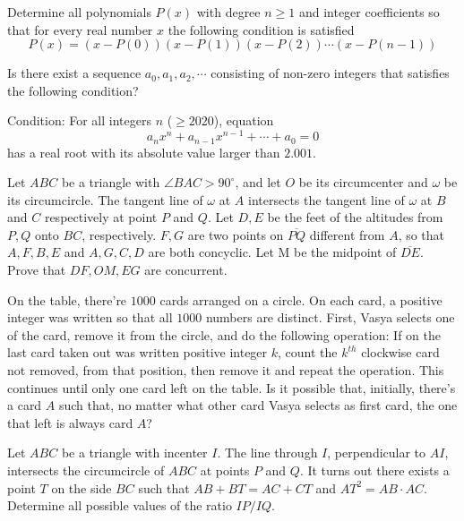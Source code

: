 \documentclass[11pt]{scrartcl}
\begin{document}
\begin{problem}[5871948911817167044]
Determine all polynomials $P(x)$ with degree $n\geq 1$ and integer coefficients so that for every real number $x$ the following condition is satisfied
$$P(x)=(x-P(0))(x-P(1))(x-P(2))\cdots (x-P(n-1))$$
\end{problem}
\begin{problem}[637496989440645]
Is there exist a sequence $a_0,a_1,a_2,\cdots $ consisting of non-zero integers that satisfies the following condition?

Condition: For all integers $n$ ($\ge 2020$), equation
$$a_n x^n+a_{n-1}x^{n-1}+\cdots +a_0=0$$has a real root with its absolute value larger than $2.001$.
\end{problem}
\begin{problem}[571373387028298]
Let $ABC$ be a triangle with $\angle BAC > 90 ^{\circ}$, and let $O$ be its circumcenter and $\omega$ be its circumcircle. The tangent line of $\omega$ at $A$ intersects the tangent line of $\omega$ at $B$ and $C$ respectively at point $P$ and $Q$. Let $D,E$ be the feet of the altitudes from $P,Q$ onto $BC$, respectively. $F,G$ are two points on $\overline{PQ}$ different from $A$, so that $A,F,B,E$ and $A,G,C,D$ are both concyclic. Let M be the midpoint of $\overline{DE}$. Prove that $DF,OM,EG$ are concurrent.
\end{problem}
\begin{problem}[1527496195334546428]
On the table, there're $1000$ cards arranged on a circle. On each card, a positive integer was written so that all $1000$ numbers are distinct. First, Vasya selects one of the card, remove it from the circle, and do the following operation: If on the last card taken out was written positive integer $k$, count the $k^{th}$ clockwise card not removed, from that position, then remove it and repeat the operation. This continues until only one card left on the table. Is it possible that, initially, there's a card $A$ such that, no matter what other card Vasya selects as first card, the one that left is always card $A$?
\end{problem}
\begin{problem}[5363953658134647103]
Let $ABC$ be a triangle with incenter $I$. The line through $I$, perpendicular to $AI$, intersects the circumcircle of $ABC$ at points $P$ and $Q$. It turns out there exists a point $T$ on the side $BC$ such that $AB + BT = AC + CT$ and $AT^2 =  AB \cdot AC$. Determine all possible values of the ratio $IP/IQ$.
\end{problem}
\end{document}
